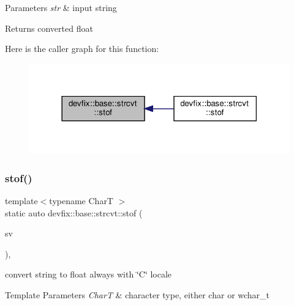 \begin{DoxyParams}{Parameters}
{\em str} & input string \\
\hline
\end{DoxyParams}
\begin{DoxyReturn}{Returns}
converted float 
\end{DoxyReturn}
Here is the caller graph for this function\+:
\nopagebreak
\begin{figure}[H]
\begin{center}
\leavevmode
\includegraphics[width=318pt]{structdevfix_1_1base_1_1strcvt_a5b28d529cfbbf026c8e1550e92e2e557_icgraph}
\end{center}
\end{figure}
\mbox{\label{structdevfix_1_1base_1_1strcvt_ad124ced1e4a75974cdf8065985028265}} 
\subsubsection{\texorpdfstring{stof()}{stof()}\hspace{0.1cm}{\footnotesize\ttfamily [2/2]}}
{\footnotesize\ttfamily template$<$typename CharT $>$ \\
static auto devfix\+::base\+::strcvt\+::stof (\begin{DoxyParamCaption}\item[{std\+::basic\+\_\+string\+\_\+view$<$ CharT $>$}]{sv }\end{DoxyParamCaption})\hspace{0.3cm}{\ttfamily [inline]}, {\ttfamily [static]}}



convert string to float always with \char`\"{}\+C\char`\"{} locale 


\begin{DoxyTemplParams}{Template Parameters}
{\em CharT} & character type, either \textquotesingle{}char\textquotesingle{} or \textquotesingle{}wchar\+\_\+t\textquotesingle{} \\
\hline
\end{DoxyTemplParams}

